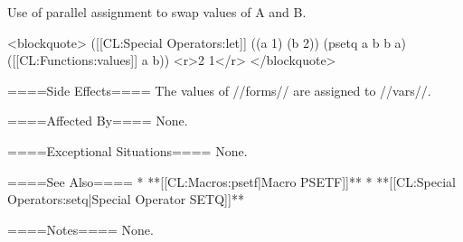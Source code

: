 Use of parallel assignment to swap values of A and B.

<blockquote>
([[CL:Special Operators:let]] ((a 1) (b 2)) 
  (psetq a b b a) 
  ([[CL:Functions:values]] a b)) 
<r>2
1</r>
</blockquote>

====Side Effects====
The values of //forms// are assigned to //vars//.

====Affected By====
None.

====Exceptional Situations====
None.

====See Also====
  * **[[CL:Macros:psetf|Macro PSETF]]**
  * **[[CL:Special Operators:setq|Special Operator SETQ]]**

====Notes====
None.

